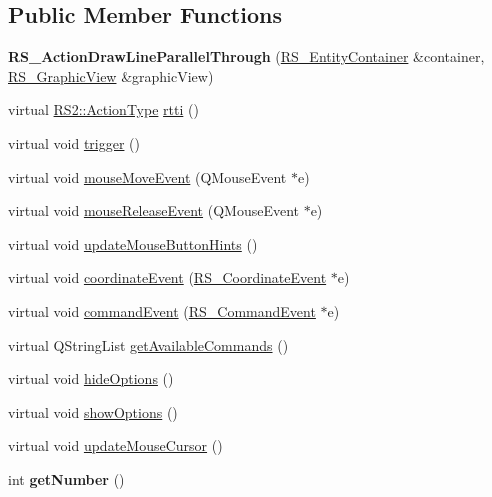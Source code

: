 \subsection*{Public Member Functions}
\begin{DoxyCompactItemize}
\item 
\hypertarget{classRS__ActionDrawLineParallelThrough_a512069a545642f9a8cfa303c398e5b7e}{{\bfseries R\-S\-\_\-\-Action\-Draw\-Line\-Parallel\-Through} (\hyperlink{classRS__EntityContainer}{R\-S\-\_\-\-Entity\-Container} \&container, \hyperlink{classRS__GraphicView}{R\-S\-\_\-\-Graphic\-View} \&graphic\-View)}\label{classRS__ActionDrawLineParallelThrough_a512069a545642f9a8cfa303c398e5b7e}

\item 
virtual \hyperlink{classRS2_afe3523e0bc41fd637b892321cfc4b9d7}{R\-S2\-::\-Action\-Type} \hyperlink{classRS__ActionDrawLineParallelThrough_aa2d4f15c9c0bc34c253e29125fcb71f1}{rtti} ()
\item 
virtual void \hyperlink{classRS__ActionDrawLineParallelThrough_a96335d73f2d8f5a400ac7d10de5132a8}{trigger} ()
\item 
virtual void \hyperlink{classRS__ActionDrawLineParallelThrough_a8937439bf30dee754d933620daaad509}{mouse\-Move\-Event} (Q\-Mouse\-Event $\ast$e)
\item 
virtual void \hyperlink{classRS__ActionDrawLineParallelThrough_a684d7dced52f3be7f16ef60739f29965}{mouse\-Release\-Event} (Q\-Mouse\-Event $\ast$e)
\item 
virtual void \hyperlink{classRS__ActionDrawLineParallelThrough_a72555468dd7a62f69cba42acef759add}{update\-Mouse\-Button\-Hints} ()
\item 
virtual void \hyperlink{classRS__ActionDrawLineParallelThrough_a15accf0b7d3db63a277ffbf509c44406}{coordinate\-Event} (\hyperlink{classRS__CoordinateEvent}{R\-S\-\_\-\-Coordinate\-Event} $\ast$e)
\item 
virtual void \hyperlink{classRS__ActionDrawLineParallelThrough_a8fff9cb714f86c5e47c1553efa3a3a2d}{command\-Event} (\hyperlink{classRS__CommandEvent}{R\-S\-\_\-\-Command\-Event} $\ast$e)
\item 
virtual Q\-String\-List \hyperlink{classRS__ActionDrawLineParallelThrough_a86170e50216945af4ccdb544b65d3636}{get\-Available\-Commands} ()
\item 
virtual void \hyperlink{classRS__ActionDrawLineParallelThrough_a833ad79ee2d0526c65267e2c0a5f98f5}{hide\-Options} ()
\item 
virtual void \hyperlink{classRS__ActionDrawLineParallelThrough_aee1319be8e0a4ec69efcf53e49bbff2c}{show\-Options} ()
\item 
virtual void \hyperlink{classRS__ActionDrawLineParallelThrough_a3471cc9abff018fc2e515475cb7779c1}{update\-Mouse\-Cursor} ()
\item 
\hypertarget{classRS__ActionDrawLineParallelThrough_a52ae78ada3e5d4ede564604b3512980e}{int {\bfseries get\-Number} ()}\label{classRS__ActionDrawLineParallelThrough_a52ae78ada3e5d4ede564604b3512980e}


\end{DoxyCompactItemize}

